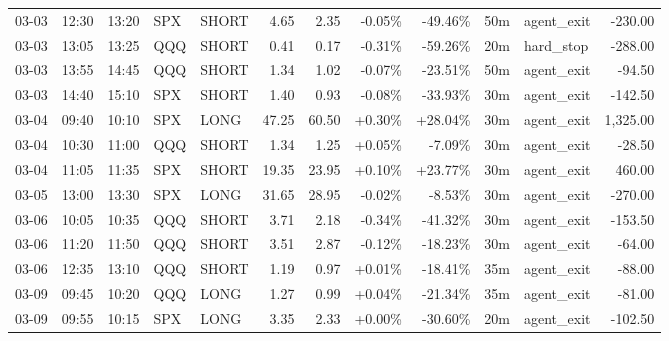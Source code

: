 \documentclass[11pt,a4paper,twoside]{article}
\begin{document}
\begin{center}
\begin{longtable}{>{\color{txtmain}}l l l l l r r r r r >{\color{txtmain}}l r}
03-03 & 12:30 & 13:20 & SPX & SHORT & 4.65 & 2.35 & \textcolor{lossred}{-0.05\%} & \textcolor{lossred}{-49.46\%} & 50m & agent\_exit & \textcolor{lossred}{-230.00} \\
03-03 & 13:05 & 13:25 & QQQ & SHORT & 0.41 & 0.17 & \textcolor{lossred}{-0.31\%} & \textcolor{lossred}{-59.26\%} & 20m & hard\_stop & \textcolor{lossred}{-288.00} \\
03-03 & 13:55 & 14:45 & QQQ & SHORT & 1.34 & 1.02 & \textcolor{lossred}{-0.07\%} & \textcolor{lossred}{-23.51\%} & 50m & agent\_exit & \textcolor{lossred}{-94.50} \\
03-03 & 14:40 & 15:10 & SPX & SHORT & 1.40 & 0.93 & \textcolor{lossred}{-0.08\%} & \textcolor{lossred}{-33.93\%} & 30m & agent\_exit & \textcolor{lossred}{-142.50} \\
03-04 & 09:40 & 10:10 & SPX & LONG & 47.25 & 60.50 & \textcolor{wingreen}{+0.30\%} & \textcolor{wingreen}{+28.04\%} & 30m & agent\_exit & \textcolor{wingreen}{1,325.00} \\
03-04 & 10:30 & 11:00 & QQQ & SHORT & 1.34 & 1.25 & \textcolor{wingreen}{+0.05\%} & \textcolor{lossred}{-7.09\%} & 30m & agent\_exit & \textcolor{lossred}{-28.50} \\
03-04 & 11:05 & 11:35 & SPX & SHORT & 19.35 & 23.95 & \textcolor{wingreen}{+0.10\%} & \textcolor{wingreen}{+23.77\%} & 30m & agent\_exit & \textcolor{wingreen}{460.00} \\
03-05 & 13:00 & 13:30 & SPX & LONG & 31.65 & 28.95 & \textcolor{lossred}{-0.02\%} & \textcolor{lossred}{-8.53\%} & 30m & agent\_exit & \textcolor{lossred}{-270.00} \\
03-06 & 10:05 & 10:35 & QQQ & SHORT & 3.71 & 2.18 & \textcolor{lossred}{-0.34\%} & \textcolor{lossred}{-41.32\%} & 30m & agent\_exit & \textcolor{lossred}{-153.50} \\
03-06 & 11:20 & 11:50 & QQQ & SHORT & 3.51 & 2.87 & \textcolor{lossred}{-0.12\%} & \textcolor{lossred}{-18.23\%} & 30m & agent\_exit & \textcolor{lossred}{-64.00} \\
03-06 & 12:35 & 13:10 & QQQ & SHORT & 1.19 & 0.97 & \textcolor{wingreen}{+0.01\%} & \textcolor{lossred}{-18.41\%} & 35m & agent\_exit & \textcolor{lossred}{-88.00} \\
03-09 & 09:45 & 10:20 & QQQ & LONG & 1.27 & 0.99 & \textcolor{wingreen}{+0.04\%} & \textcolor{lossred}{-21.34\%} & 35m & agent\_exit & \textcolor{lossred}{-81.00} \\
03-09 & 09:55 & 10:15 & SPX & LONG & 3.35 & 2.33 & \textcolor{wingreen}{+0.00\%} & \textcolor{lossred}{-30.60\%} & 20m & agent\_exit & \textcolor{lossred}{-102.50} \\

\end{longtable}
\end{center}
\end{document}
